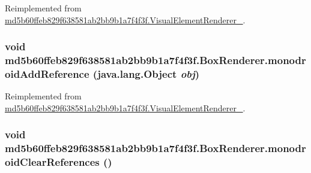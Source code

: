 Reimplemented from \hyperlink{classmd5b60ffeb829f638581ab2bb9b1a7f4f3f_1_1_visual_element_renderer__1_3ae26bd8575212fb6d6f14487b4f48d4}{md5b60ffeb829f638581ab2bb9b1a7f4f3f.VisualElementRenderer\_}.\hypertarget{classmd5b60ffeb829f638581ab2bb9b1a7f4f3f_1_1_box_renderer_2c691e6eae3cfe1b2cfe9fbee3e51baf}{
\subsubsection[{monodroidAddReference}]{\setlength{\rightskip}{0pt plus 5cm}void md5b60ffeb829f638581ab2bb9b1a7f4f3f.BoxRenderer.monodroidAddReference (java.lang.Object {\em obj})}}
\label{classmd5b60ffeb829f638581ab2bb9b1a7f4f3f_1_1_box_renderer_2c691e6eae3cfe1b2cfe9fbee3e51baf}




Reimplemented from \hyperlink{classmd5b60ffeb829f638581ab2bb9b1a7f4f3f_1_1_visual_element_renderer__1_321b2967faff34b0f7971f55915f583e}{md5b60ffeb829f638581ab2bb9b1a7f4f3f.VisualElementRenderer\_}.\hypertarget{classmd5b60ffeb829f638581ab2bb9b1a7f4f3f_1_1_box_renderer_2f64a02b513057089e1099ba75855aa2}{
\subsubsection[{monodroidClearReferences}]{\setlength{\rightskip}{0pt plus 5cm}void md5b60ffeb829f638581ab2bb9b1a7f4f3f.BoxRenderer.monodroidClearReferences ()}}
\label{classmd5b60ffeb829f638581ab2bb9b1a7f4f3f_1_1_box_renderer_2f64a02b513057089e1099ba75855aa2}




